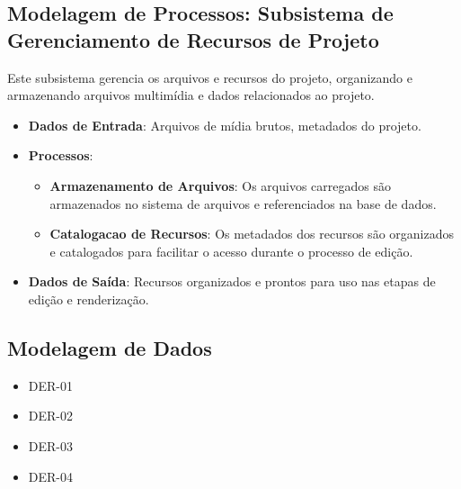 \subsection{Modelagem de Processos: Subsistema de Gerenciamento de Recursos de Projeto}
Este subsistema gerencia os arquivos e recursos do projeto, organizando e armazenando arquivos multimídia e dados relacionados ao projeto.

\begin{itemize}
    \item \textbf{Dados de Entrada}: Arquivos de mídia brutos, metadados do projeto.
    \item \textbf{Processos}:
        \begin{itemize}
            \item \textbf{Armazenamento de Arquivos}: Os arquivos carregados são armazenados no sistema de arquivos e referenciados na base de dados.
            \item \textbf{Catalogacao de Recursos}: Os metadados dos recursos são organizados e catalogados para facilitar o acesso durante o processo de edição.
        \end{itemize}
    \item \textbf{Dados de Saída}: Recursos organizados e prontos para uso nas etapas de edição e renderização.
\end{itemize}

\subsection{Modelagem de Dados}

\begin{itemize}
  \item DER-01

  \item DER-02

  \item DER-03

  \item DER-04

\end{itemize}

